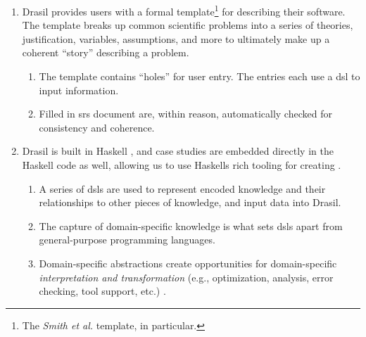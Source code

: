 \begin{enumerate}

      \item Drasil provides users with a formal  template\footnote{The
                  \textit{Smith et al.} \cite{SmithAndLai2005} template, in
                  particular.} for describing their software. The template
            breaks up common scientific problems into a series of
            theories, justification, variables, assumptions, and more to
            ultimately make up a coherent ``story'' describing a problem.

            \begin{enumerate}

                  \item The template contains ``holes'' for user entry. The
                        entries each use a \acs{dsl} to input information.

                  \item Filled in \acs{srs} document are, within reason,
                        automatically checked for consistency and coherence.

            \end{enumerate}

      \item Drasil is built in Haskell \cite{Haskell2010}, and case studies are
            embedded directly in the Haskell code as well, allowing us to use
            Haskells rich tooling for creating .
            \begin{enumerate}

                  \item A series of \acsp{dsl} are used to represent encoded
                        knowledge and their relationships to other pieces of
                        knowledge, and input data into Drasil.

                  \item The capture of domain-specific knowledge is what sets
                        \acsp{dsl} apart from general-purpose programming
                        languages.

                  \item Domain-specific abstractions create opportunities for
                        domain-specific \textit{interpretation and
                              transformation} (e.g., optimization, analysis, error
                        checking, tool support, etc.) \cite{Czarnecki2005}.


\end{enumerate}
\end{enumerate}
